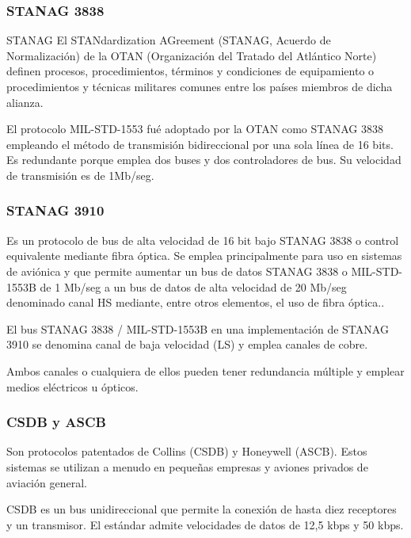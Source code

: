 \subsubsection{STANAG 3838}
\label{sec:01.02.STANAG.3838}

\begin{myboxAmarillo}{STANAG}
  El STANdardization AGreement (STANAG, Acuerdo de Normalización) de
  la OTAN (Organización del Tratado del Atlántico Norte) definen
  procesos, procedimientos, términos y condiciones de equipamiento o
  procedimientos y técnicas militares comunes entre los países
  miembros de dicha alianza.
\end{myboxAmarillo}


El protocolo MIL-STD-1553 
fué adoptado por la OTAN como STANAG 3838 empleando el método de transmisión bidireccional por una sola línea  de 16 bits. Es redundante porque emplea dos buses y dos controladores de bus. Su velocidad de transmisión es de 1Mb/seg.

\subsubsection{STANAG 3910 }
\label{sec:01.02.STANAG3910 }

Es un protocolo de bus de alta velocidad de 16 bit bajo STANAG 3838 o control equivalente mediante fibra óptica. Se emplea principalmente para uso en sistemas de aviónica y que permite aumentar un bus de datos STANAG 3838 o MIL-STD-1553B de 1 Mb/seg a un bus de datos de alta velocidad de 20 Mb/seg denominado canal HS mediante, entre otros elementos, el uso de fibra óptica..

El bus STANAG 3838 / MIL-STD-1553B en una implementación de STANAG 3910 se denomina canal de baja velocidad (LS) y emplea canales de cobre. 

Ambos canales o cualquiera de ellos pueden tener redundancia múltiple y emplear medios eléctricos u ópticos.

\subsubsection{CSDB y ASCB}
\label{sec:01.02.CSDB+ASCB}

Son protocolos patentados de Collins (CSDB) y Honeywell (ASCB). 
Estos sistemas se utilizan a menudo en pequeñas empresas y aviones privados de aviación general. 

CSDB es un bus unidireccional que permite la conexión de hasta diez receptores y un transmisor. El estándar admite velocidades de datos de 12,5 kbps y 50 kbps. 

